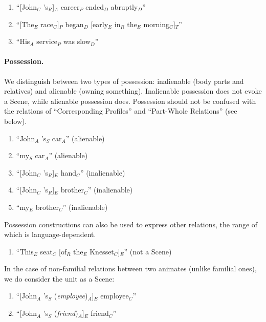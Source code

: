 \documentclass[11pt]{article}
\newcommand{\be}{\begin{enumerate}}
\newcommand{\ee}{\end{enumerate}}
\newcommand{\rem}[1]{{(\it #1})}
\begin{document}
\be
\item
``[John$_C$ 's$_R$]$_A$ career$_P$ ended$_D$ abruptly$_D$''
\item  
``[The$_E$ race$_C$]$_P$ began$_D$ [early$_E$ in$_R$ the$_E$ morning$_C$]$_T$''
\item
``His$_A$ service$_P$ was slow$_D$''
\ee



\paragraph{Possession.} We distinguish between two types of possession: inalienable (body parts and relatives) and alienable (owning something). Inalienable possession does not evoke a Scene, while alienable possession does. 
Possession should not be confused with the relations of ``Corresponding Profiles'' and ``Part-Whole Relations'' (see below).
\be 
\item
``John$_A$ 's$_S$ car$_A$'' (alienable)
\item
``my$_S$ car$_A$'' (alienable)
\item
``[John$_C$ 's$_R$]$_E$ hand$_C$'' (inalienable) 
\item
``[John$_C$ 's$_R$]$_E$ brother$_C$'' (inalienable) 
\item
``my$_E$ brother$_C$'' (inalienable) 
\ee

\noindent
Possession constructions can also be used to express other relations, the range of which is language-dependent.

\be
\item
``This$_E$ seat$_C$ [of$_R$ the$_E$ Knesset$_C$]$_E$'' (not a Scene)
\ee

\noindent
In the case of non-familial relations between two animates (unlike familial ones), we do consider the unit as a Scene: 
\be
\item ``[John$_A$ 's$_S$ \rem{employee}$_A$]$_E$ employee$_C$'' 
\item ``[John$_A$ 's$_S$ \rem{friend}$_A$]$_E$ friend$_C$''
\ee
\end{document}
